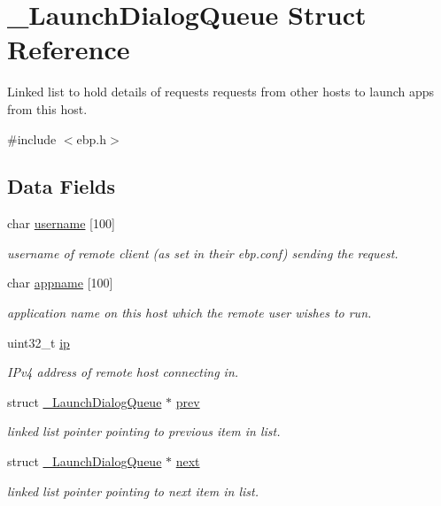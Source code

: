 \hypertarget{struct___launch_dialog_queue}{\section{\-\_\-\-Launch\-Dialog\-Queue \-Struct \-Reference}
\label{struct___launch_dialog_queue}
}


\-Linked list to hold details of requests requests from other hosts to launch apps from this host.  




{\ttfamily \#include $<$ebp.\-h$>$}

\subsection*{\-Data \-Fields}
\begin{DoxyCompactItemize}
\item 
char \hyperlink{struct___launch_dialog_queue_a05eeba7fa0e9f1c4fcb8110937b46236}{username} \mbox{[}100\mbox{]}
\begin{DoxyCompactList}\small\item\em username of remote client (as set in their ebp.\-conf) sending the request. \end{DoxyCompactList}\item 
char \hyperlink{struct___launch_dialog_queue_aa9bb8e0298777697761f6c5d34032a78}{appname} \mbox{[}100\mbox{]}
\begin{DoxyCompactList}\small\item\em application name on this host which the remote user wishes to run. \end{DoxyCompactList}\item 
uint32\-\_\-t \hyperlink{struct___launch_dialog_queue_a69ddb9c845da426f636d9dd0dbed4e7e}{ip}
\begin{DoxyCompactList}\small\item\em \-I\-Pv4 address of remote host connecting in. \end{DoxyCompactList}\item 
struct \hyperlink{struct___launch_dialog_queue}{\-\_\-\-Launch\-Dialog\-Queue} $\ast$ \hyperlink{struct___launch_dialog_queue_afdf1225bcd61e554ebfcc98eacc3c234}{prev}
\begin{DoxyCompactList}\small\item\em linked list pointer pointing to previous item in list. \end{DoxyCompactList}\item 
struct \hyperlink{struct___launch_dialog_queue}{\-\_\-\-Launch\-Dialog\-Queue} $\ast$ \hyperlink{struct___launch_dialog_queue_a4a84428c2db73786a25a86dec566e549}{next}
\begin{DoxyCompactList}\small\item\em linked list pointer pointing to next item in list. \end{DoxyCompactList}\end{DoxyCompactItemize}


